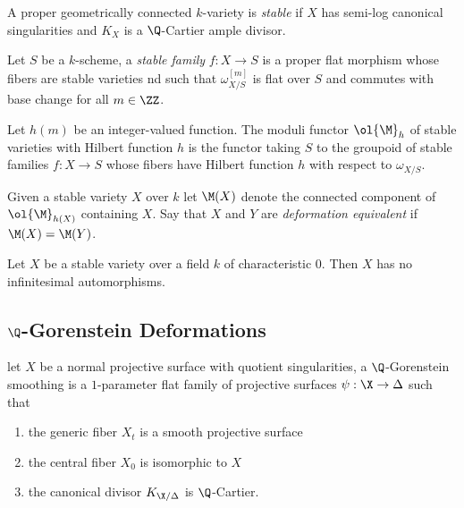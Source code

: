 \documentclass[12pt]{article}
\begin{document}
\begin{defn}
A proper geometrically connected $k$-variety is \textit{stable} if $X$ has semi-log canonical singularities and $K_X$ is a $\Q$-Cartier ample divisor.
\end{defn}

\begin{defn}
Let $S$ be a $k$-scheme, a \textit{stable family} $f : X \to S$ is a proper flat morphism whose fibers are stable varieties nd such that $\omega_{X/S}^{[m]}$ is flat over $S$ and commutes with base change for all $m \in \ZZ$.
\end{defn}

\begin{defn}
Let $h(m)$ be an integer-valued function. The moduli functor $\ol{\M}_h$ of stable varieties with Hilbert function $h$ is the functor taking $S$ to the groupoid of stable families $f : X \to S$ whose fibers have Hilbert function $h$ with respect to $\omega_{X/S}$. 
\end{defn}

\begin{defn}
Given a stable variety $X$ over $k$ let $\M(X)$ denote the connected component of $\ol{\M}_{h(X)}$ containing $X$. Say that $X$ and $Y$ are \textit{deformation equivalent} if $\M(X) = \M(Y)$.
\end{defn}

\begin{lemma}[BHPS]
Let $X$ be a stable variety over a field $k$ of characteristic $0$. Then $X$ has no infinitesimal automorphisms. 
\end{lemma}

\subsection{$\Q$-Gorenstein Deformations}

\begin{defn}
let $X$ be a normal projective surface with quotient singularities, a $\Q$-Gorenstein smoothing is a $1$-parameter flat family of projective surfaces $\psi : \X \to \Delta$ such that
\begin{enumerate}
\item the generic fiber $X_t$ is a smooth projective surface
\item the central fiber $X_0$ is isomorphic to $X$
\item the canonical divisor $K_{\X / \Delta}$ is $\Q$-Cartier.
\end{enumerate}
\end{defn}
\end{document}
